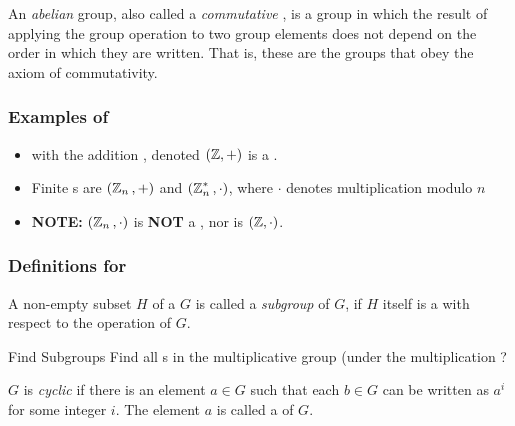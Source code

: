 \begin{definition}[Abelian]\label{def:Abelian}
  An \emph{abelian} group, also called a \emph{commutative }, is a group in which the result of applying the group operation to two group elements does not depend on the order in which they are written.
  That is, these are the groups that obey the axiom of commutativity.
\end{definition}

\subsubsection{Examples of }\label{subsubsec:Examples_of_Groups}
\begin{itemize}[noitemsep]
\item \TextAllIntegers{} with the addition , denoted $(\operatorname{\mathbb{Z}}, +)$ is a .
\item Finite s are $(\operatorname{\mathbb{Z}}_{n}{}, +)$ and $(\operatorname{\mathbb{Z}}_{n}^{*}{}, \cdot)$, where $\cdot$ denotes multiplication modulo $n$
\item \textbf{NOTE:} $(\operatorname{\mathbb{Z}}_{n}{}, \cdot)$ is \textbf{NOT} a , nor is $(\operatorname{\mathbb{Z}}, \cdot)$.
\end{itemize}

\subsubsection{Definitions for }\label{subsubsec:Definitions_for_Groups}
\begin{definition}[Subgroup]\label{def:Subgroup}
  A non-empty subset $H$ of a  $G$ is called a \emph{subgroup} of $G$, if $H$ itself is a  with respect to the operation of $G$.
\end{definition}

\begin{example}{Find Subgroups}
  Find all s in the multiplicative group  (under the multiplication ?
  \tcblower{}
\end{example}

\begin{definition}[Cyclic]\label{def:Cyclic}
  $G$ is \emph{cyclic} if there is an element $a \in G$ such that each $b \in G$ can be written as $a^{i}$ for some integer $i$.
  The element $a$ is called a \emph{} of $G$.
\end{definition}

